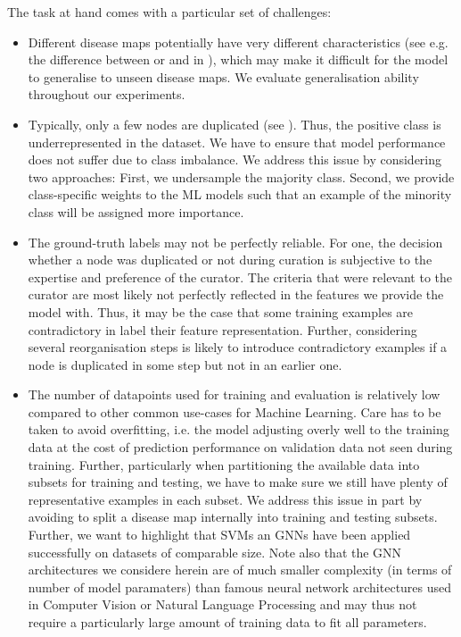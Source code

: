 \documentclass[
	fontsize=10pt, %
	twoside=false, %
	secnumdepth=1, %
  toc=indentunnumbered %
]{kaobook}
\begin{document}


The task at hand comes with a particular set of challenges:
\begin{itemize}
\item Different disease maps potentially have very different characteristics
  (see e.g. the difference between \ADMap or \PDMap and \ReconMap in
  ), which may make it difficult for the model to
  generalise to unseen disease maps. We evaluate generalisation ability
  throughout our experiments.
\item Typically, only a few nodes are duplicated (see ).
  Thus, the positive class is underrepresented in the dataset. We have to ensure that
  model performance does not suffer due to class imbalance. We address this
  issue by considering two approaches: First, we undersample the majority class.
  Second, we provide class-specific weights to the ML models such that an
  example of the minority class will be assigned more importance.
\item The ground-truth labels may not be perfectly reliable.
  For one, the decision whether a node was duplicated or not during curation is
  subjective to the expertise and preference of the curator. The criteria that
  were relevant to the curator are most likely not perfectly reflected in the
  features we provide the model with.
  Thus, it may be the case that some
  training examples are contradictory in label \wrt their feature
  representation. Further, considering several reorganisation steps is likely to
  introduce contradictory examples if a node is duplicated in some step but not
  in an earlier one.
\item The number of datapoints used for training and evaluation is relatively
  low compared to other common use-cases for Machine Learning. Care has to be
  taken to avoid overfitting, i.e. the model adjusting overly well to the training
  data at the cost of prediction performance on validation data not seen during
  training. Further, particularly when partitioning the available data into
  subsets for training and testing, we have to make sure we still have plenty of
  representative examples in each subset. We address this issue in part by avoiding to
  split a disease map internally into training and testing subsets. Further, we
  want to highlight that SVMs an GNNs have been applied successfully on datasets
  of comparable size.
  Note also that the GNN architectures we considere herein are of
  much smaller complexity (in terms of number of model paramaters) than famous
  neural network architectures used in Computer Vision or Natural Language
  Processing
  and may thus not require a particularly large amount of training
  data to fit all parameters.
\end{itemize}
\end{document}
